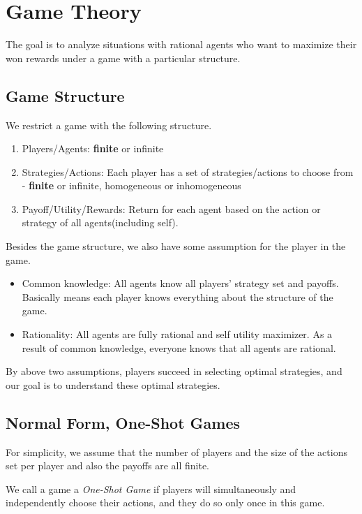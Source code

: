 \chapter{Game Theory}
The goal is to analyze situations with rational agents who want to maximize their won rewards under a game with a particular structure.

\section{Game Structure}
We restrict a game with the following structure.
\begin{enumerate}
	\item Players/Agents: \textbf{finite} or infinite
	\item Strategies/Actions: Each player has a set of strategies/actions to choose from - \textbf{finite} or infinite, homogeneous or inhomogeneous
	\item Payoff/Utility/Rewards: Return for each agent based on the action or strategy of all agents(including self).
\end{enumerate}

Besides the game structure, we also have some assumption for the player in the game.
\begin{itemize}
	\item Common knowledge: All agents know all players' strategy set and payoffs. Basically means each player knows everything about the structure of the game.
	\item Rationality: All agents are fully rational and self utility maximizer. As a result of common knowledge, everyone knows that all
	      agents are rational.
\end{itemize}

\begin{note}
	By above two assumptions, players succeed in selecting optimal strategies, and our goal is to understand these optimal strategies.
\end{note}

\section{Normal Form, One-Shot Games}
For simplicity, we assume that the number of players and the size of the actions set per player and also the payoffs are all finite.

\begin{definition}
	We call a game a \emph{One-Shot Game} if players will simultaneously and independently choose their actions, and they do
	so only once in this game.
\end{definition}

